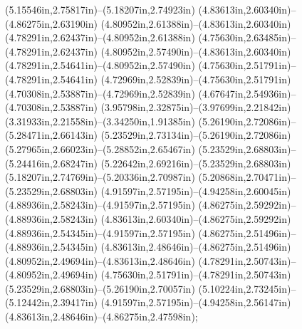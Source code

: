 (5.15546in,2.75817in)--(5.18207in,2.74923in) (4.83613in,2.60340in)--(4.86275in,2.63190in) (4.80952in,2.61388in)--(4.83613in,2.60340in) (4.78291in,2.62437in)--(4.80952in,2.61388in) (4.75630in,2.63485in)--(4.78291in,2.62437in) (4.80952in,2.57490in)--(4.83613in,2.60340in) (4.78291in,2.54641in)--(4.80952in,2.57490in) (4.75630in,2.51791in)--(4.78291in,2.54641in) (4.72969in,2.52839in)--(4.75630in,2.51791in) (4.70308in,2.53887in)--(4.72969in,2.52839in) (4.67647in,2.54936in)--(4.70308in,2.53887in) (3.95798in,2.32875in)--(3.97699in,2.21842in) (3.31933in,2.21558in)--(3.34250in,1.91385in) (5.26190in,2.72086in)--(5.28471in,2.66143in) (5.23529in,2.73134in)--(5.26190in,2.72086in) (5.27965in,2.66023in)--(5.28852in,2.65467in) (5.23529in,2.68803in)--(5.24416in,2.68247in) (5.22642in,2.69216in)--(5.23529in,2.68803in) (5.18207in,2.74769in)--(5.20336in,2.70987in) (5.20868in,2.70471in)--(5.23529in,2.68803in) (4.91597in,2.57195in)--(4.94258in,2.60045in) (4.88936in,2.58243in)--(4.91597in,2.57195in) (4.86275in,2.59292in)--(4.88936in,2.58243in) (4.83613in,2.60340in)--(4.86275in,2.59292in) (4.88936in,2.54345in)--(4.91597in,2.57195in) (4.86275in,2.51496in)--(4.88936in,2.54345in) (4.83613in,2.48646in)--(4.86275in,2.51496in) (4.80952in,2.49694in)--(4.83613in,2.48646in) (4.78291in,2.50743in)--(4.80952in,2.49694in) (4.75630in,2.51791in)--(4.78291in,2.50743in) (5.23529in,2.68803in)--(5.26190in,2.70057in) (5.10224in,2.73245in)--(5.12442in,2.39417in) (4.91597in,2.57195in)--(4.94258in,2.56147in) (4.83613in,2.48646in)--(4.86275in,2.47598in);
